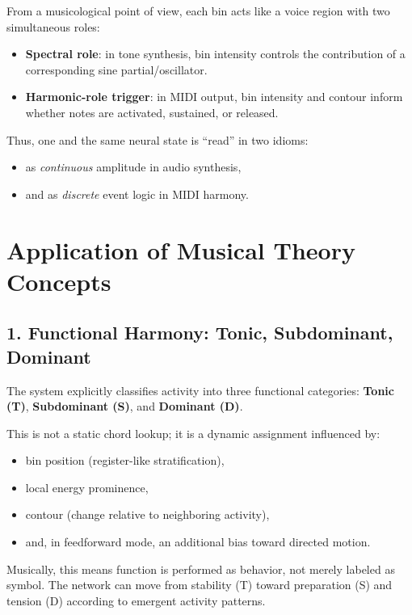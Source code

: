 \documentclass[11pt,a4paper]{article}
\begin{document}
From a musicological point of view, each bin acts like a voice region with two simultaneous roles:
\begin{itemize}
    \item \textbf{Spectral role}: in tone synthesis, bin intensity controls the contribution of a
    corresponding sine partial/oscillator.
    \item \textbf{Harmonic-role trigger}: in MIDI output, bin intensity and contour inform whether notes
    are activated, sustained, or released.
\end{itemize}

Thus, one and the same neural state is ``read'' in two idioms:
\begin{itemize}
    \item as \emph{continuous} amplitude in audio synthesis,
    \item and as \emph{discrete} event logic in MIDI harmony.
\end{itemize}

\section*{Application of Musical Theory Concepts}

\subsection*{1. Functional Harmony: Tonic, Subdominant, Dominant}

The system explicitly classifies activity into three functional categories:
\textbf{Tonic (T)}, \textbf{Subdominant (S)}, and \textbf{Dominant (D)}.

This is not a static chord lookup; it is a dynamic assignment influenced by:
\begin{itemize}
    \item bin position (register-like stratification),
    \item local energy prominence,
    \item contour (change relative to neighboring activity),
    \item and, in feedforward mode, an additional bias toward directed motion.
\end{itemize}

Musically, this means function is performed as behavior, not merely labeled as symbol.
The network can move from stability (T) toward preparation (S) and tension (D)
according to emergent activity patterns.
\end{document}
